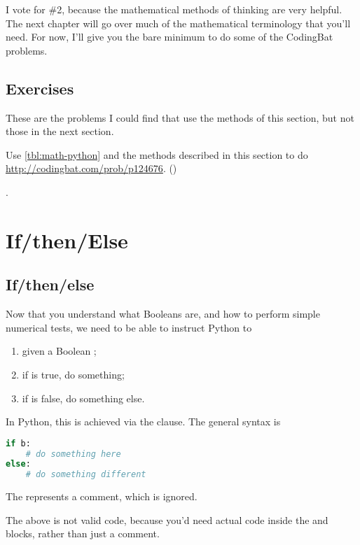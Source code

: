 I vote for \#2, because the mathematical methods of thinking are very
helpful. The next chapter will go over much of the mathematical
terminology that you'll need. For now, I'll give you the bare minimum
to do some of the CodingBat problems.

\subsection{Exercises}

These are the problems I could find that use the methods of this
section, but not those in the next section.

\begin{exercise}
  Use \cref{tbl:math-python} and the methods described in this section
  to do \url{http://codingbat.com/prob/p124676}. ()
\end{exercise}
.

\section{If/then/Else}

\subsection{If/then/else}

Now that you understand what Booleans are, and how to perform simple
numerical tests, we need to be able to instruct Python to

\begin{enumerate}
\item given a Boolean ;
\item if  is true, do something;
\item if  is false, do something else.
\end{enumerate}

In Python, this is achieved via the  clause. The general
syntax is

\begin{lstlisting}[language=Python]
if b:
    # do something here
else:
    # do something different
\end{lstlisting}

The \code{#} represents a comment, which is ignored.

\begin{remark}
  The above is not valid code, because you'd need actual code inside
  the  and  blocks, rather than just a comment.
\end{remark}

